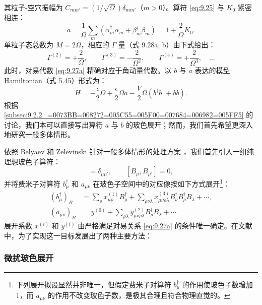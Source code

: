 其粒子-空穴振幅为 $C_{mm'}=(1/\sqrt{\Omega})\delta_{mm'}$（$m>0$）。算符 \ref{eq:9.25}
与 $K_{0}$ 紧密相连：
\begin{equation}
a=\frac{1}{\Omega}\sum_{m}\left(\alpha^{\dagger}_{m}\alpha_{m}+\beta^{\dagger}_{m}\beta_{m}\right)=1+\frac{2}{\Omega}K_{0}.\label{eq:9.36}
\end{equation}
单粒子态总数为 $M=2\Omega$，相应的 $\Gamma$ 量（式 9.28a, b）由下式给出：
\begin{equation}
\Gamma^{(2)}=+\frac{2}{\Omega},\qquad\Gamma^{(3)}=-\frac{2}{\Omega^{2}},\qquad\Gamma^{(4)}=+\frac{2}{\Omega^{3}},\quad\ldots\label{eq:9.37}
\end{equation}
此时，对易代数 \ref{eq:9.27a} 精确对应于角动量代数。以 $b$ 与 $a$ 表达的模型 Hamiltonian（式
5.45）形式为：
\begin{equation}
H=-\frac{\epsilon}{2}\Omega+\frac{\epsilon}{2}\Omega a-\frac{V}{2}\Omega(b^{\dagger}b^{\dagger}+bb).\label{eq:9.38}
\end{equation}
根据 \ref{subsec:9.2.2_=0073BB=008272=005C55=005F00=007684=006982=005FF5}
的讨论，我们本可以直接写出算符 $a$ 与 $b$ 的玻色展开；然而，我们首先希望更深入地研究一般多体情形。

依照 Belyaev 和 Zelevinski 针对一般多体情形的处理方案 \cite{BZ62}，我们首先引入一组纯理想玻色子算符：
\begin{equation}
[B_{\mu},B^{\dagger}_{\mu'}]=\delta_{\mu\mu'},\qquad[B_{\mu},B_{\mu'}]=0,\label{eq:9.39}
\end{equation}
并将费米子对算符 $b^{\dagger}_{\mu}$ 和 $a_{\mu\nu}$ 在玻色子空间中的对应像按如下方式展开\footnote{下列展开拟设显然并非唯一，但假定费米子对算符 $b^{\dagger}_{\mu}$ 的作用使玻色子数增加 1，而 $a_{\mu\nu}$
的作用不改变玻色子数，是极其合理且符合物理直觉的。}：
\begin{align}
(b^{\dagger}_{\mu})_{B} & =\sum_{\rho}x^{(1)}_{\mu\rho}B^{\dagger}_{\rho}+\sum_{\rho\nu\lambda}x^{(3)}_{\mu\nu\rho\lambda}B^{\dagger}_{\nu}B^{\dagger}_{\rho}B_{\lambda}+\cdots,\label{eq:9.40a}\\
(a_{\mu\nu})_{B} & =y^{(0)}+\sum_{\rho\lambda}y^{(2)}_{\mu\nu\rho\lambda}B^{\dagger}_{\rho}B_{\lambda}+\cdots.\label{eq:9.40b}
\end{align}
展开系数 $x^{(i)}$ 和 $y^{(i)}$ 由严格满足对易关系 \ref{eq:9.27a} 的条件唯一确定。在文献中，为了实现这一目标发展出了两种主要方法：

\subsubsection{微扰玻色展开\label{subsubsec:9.2.3.1_=005FAE=006270=0073BB=008272=005C55=005F00}}

